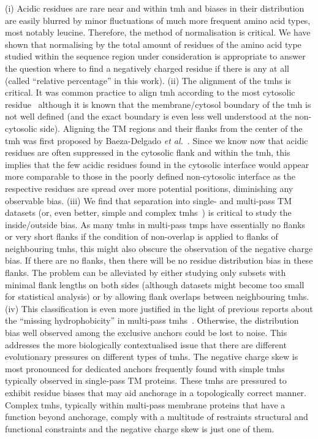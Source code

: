 (i) Acidic residues are rare near and within \gls{tmh} and biases in their distribution are easily blurred by minor fluctuations of much more frequent amino acid types, most notably leucine. Therefore, the method of normalisation is critical. We have shown that normalising by the total amount of residues of the amino acid type studied within the sequence region under consideration is appropriate to answer the question where to find a negatively charged residue if there is any at all (called “relative percentage” in this work).
(ii) The alignment of the \gls{tmh}s is critical. It was common practice to align \gls{tmh} according to the most cytosolic residue~\cite{Sharpe2010} although it is known that the membrane/cytosol boundary of the \gls{tmh} is not well defined (and the exact boundary is even less well understood at the non-cytosolic side). Aligning the TM regions and their flanks from the center of the \gls{tmh} was first proposed by Baeza-Delgado \textit{et al.}~\cite{Baeza-Delgado2013}. Since we know now that acidic residues are often suppressed in the cytosolic flank and within the \gls{tmh}, this implies that the few acidic residues found in the cytosolic interface would appear more comparable to those in the poorly defined non-cytosolic interface as the respective residues are spread over more potential positions, diminishing any observable bias.
(iii) We find that separation into single- and multi-pass TM datasets (or, even better, simple and complex \gls{tmh}s~\cite{Wong2011, Wong2012}) is critical to study the inside/outside bias. As many \gls{tmh}s in multi-pass \gls{tmp}s have essentially no flanks or very short flanks if the condition of non-overlap is applied to flanks of neighbouring \gls{tmh}s, this might also obscure the observation of the negative charge bias. If there are no flanks, then there will be no residue distribution bias in these flanks. The problem can be alleviated by either studying only subsets with minimal flank lengths on both sides (although datasets might become too small for statistical analysis) or by allowing flank overlaps between neighbouring \gls{tmh}s.
(iv) This classification is even more justified in the light of previous reports about the “missing hydrophobicity” in multi-pass \gls{tmh}s~\cite{Nilsson1990, Hedin2010, Hessa2007, Ojemalm2012}. Otherwise, the distribution bias well observed among the exclusive anchors could be lost to noise.  This addresses the more biologically contextualised issue that there are different evolutionary pressures on different types of \gls{tmh}s. The negative charge skew is most pronounced for dedicated anchors frequently found with simple \gls{tmh}s typically observed in single-pass TM proteins. These \gls{tmh}s are pressured to exhibit residue biases that may aid anchorage in a topologically correct manner. Complex \gls{tmh}s, typically within multi-pass membrane proteins that have a function beyond anchorage, comply with a multitude of restraints structural and functional constraints and the negative charge skew is just one of them.

